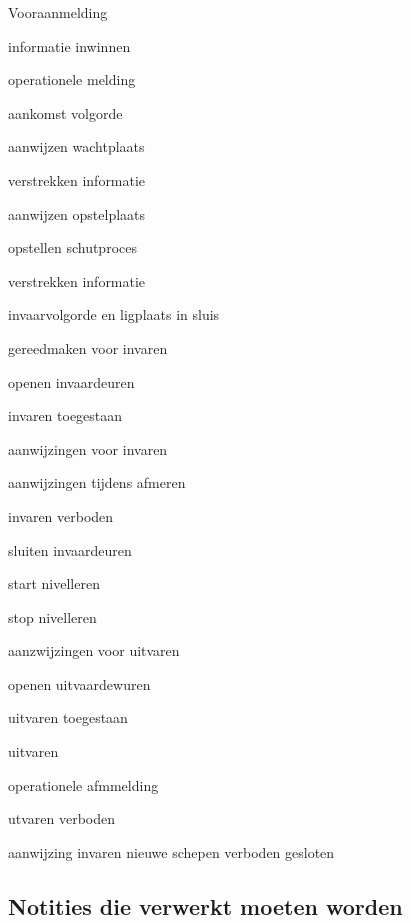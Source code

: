 \begin{itemize}
	\begin{minipage}{0.4\linewidth}
		\item Vooraanmelding
		\item informatie inwinnen
		\item operationele melding
		\item aankomst volgorde
		\item aanwijzen wachtplaats
		\item verstrekken informatie
		\item aanwijzen opstelplaats
		\item opstellen schutproces
		\item verstrekken informatie
		\item invaarvolgorde en ligplaats in sluis
		\item
		\item
	\end{minipage}
\begin{minipage}{0.4\linewidth}

		\item gereedmaken voor invaren
		\item openen invaardeuren
		\item invaren toegestaan
		\item aanwijzingen voor invaren
		\item aanwijzingen tijdens afmeren
		\item invaren verboden
		\item sluiten invaardeuren
		\item start nivelleren
		\item stop nivelleren
		\item aanzwijzingen voor uitvaren
		\item openen uitvaardewuren
		\item uitvaren toegestaan
	
\end{minipage}
	\begin{minipage}{0.4\linewidth}
	\item uitvaren
	\item operationele afmmelding
	\item utvaren verboden
	\item aanwijzing invaren nieuwe schepen
	\invaren verboden
	\deuren gesloten
	\end{minipage}
\end{itemize}


\subsection{Notities die verwerkt moeten worden}

